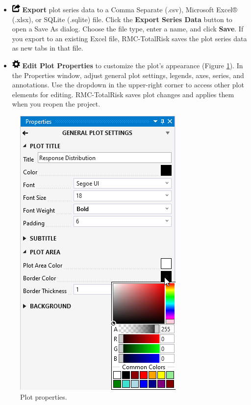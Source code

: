 \documentclass[
]{book}
\begin{document}
\begin{itemize}
\item
  \includegraphics{images/exportplot.png} \textbf{Export} plot series data to a Comma Separate (.csv), Microsoft Excel® (.xlsx), or SQLite (.sqlite) file. Click the \textbf{Export Series Data} button to open a Save As dialog. Choose the file type, enter a name, and click \textbf{Save}. If you export to an existing Excel file, RMC-TotalRisk saves the plot series data as new tabs in that file.
\item
  \includegraphics{images/plotproperties.png} \textbf{Edit Plot Properties} to customize the plot's appearance (Figure \ref{fig:figure-44}). In the Properties window, adjust general plot settings, legends, axes, series, and annotations. Use the dropdown in the upper-right corner to access other plot elements for editing. RMC-TotalRisk saves plot changes and applies them when you reopen the project.
\end{itemize}

\begin{figure}

{\centering \includegraphics{images/figure44} 

}

\caption{Plot properties.}\label{fig:figure-44}
\end{figure}
\end{document}
